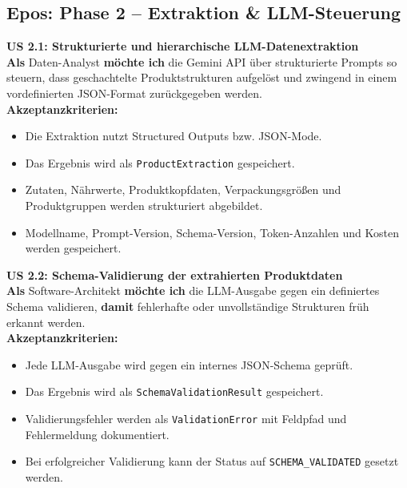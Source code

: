 \documentclass[11pt,a4paper]{article}
\begin{document}
\subsection{Epos: Phase 2 – Extraktion \& LLM-Steuerung}

\noindent\colorbox{usgray}{%
\begin{minipage}{\dimexpr\textwidth-2\fboxsep\relax}
\textbf{\textcolor{usblue}{US 2.1: Strukturierte und hierarchische LLM-Datenextraktion}} \\[0.5em]
\textbf{Als} Daten-Analyst \textbf{möchte ich} die Gemini API über strukturierte Prompts so steuern, dass geschachtelte Produktstrukturen aufgelöst und zwingend in einem vordefinierten JSON-Format zurückgegeben werden.\\[0.5em]
\textbf{Akzeptanzkriterien:}
\begin{itemize}[leftmargin=*, parsep=0pt, topsep=0pt, itemsep=2pt]
    \item Die Extraktion nutzt Structured Outputs bzw. JSON-Mode.
    \item Das Ergebnis wird als \texttt{ProductExtraction} gespeichert.
    \item Zutaten, Nährwerte, Produktkopfdaten, Verpackungsgrößen und Produktgruppen werden strukturiert abgebildet.
    \item Modellname, Prompt-Version, Schema-Version, Token-Anzahlen und Kosten werden gespeichert.
\end{itemize}
\end{minipage}}
\vspace{1em}

\noindent\colorbox{usgray}{%
\begin{minipage}{\dimexpr\textwidth-2\fboxsep\relax}
\textbf{\textcolor{usblue}{US 2.2: Schema-Validierung der extrahierten Produktdaten}} \\[0.5em]
\textbf{Als} Software-Architekt \textbf{möchte ich} die LLM-Ausgabe gegen ein definiertes Schema validieren, \textbf{damit} fehlerhafte oder unvollständige Strukturen früh erkannt werden.\\[0.5em]
\textbf{Akzeptanzkriterien:}
\begin{itemize}[leftmargin=*, parsep=0pt, topsep=0pt, itemsep=2pt]
    \item Jede LLM-Ausgabe wird gegen ein internes JSON-Schema geprüft.
    \item Das Ergebnis wird als \texttt{SchemaValidationResult} gespeichert.
    \item Validierungsfehler werden als \texttt{ValidationError} mit Feldpfad und Fehlermeldung dokumentiert.
    \item Bei erfolgreicher Validierung kann der Status auf \texttt{SCHEMA\_VALIDATED} gesetzt werden.
\end{itemize}
\end{minipage}}
\vspace{1em}
\end{document}
